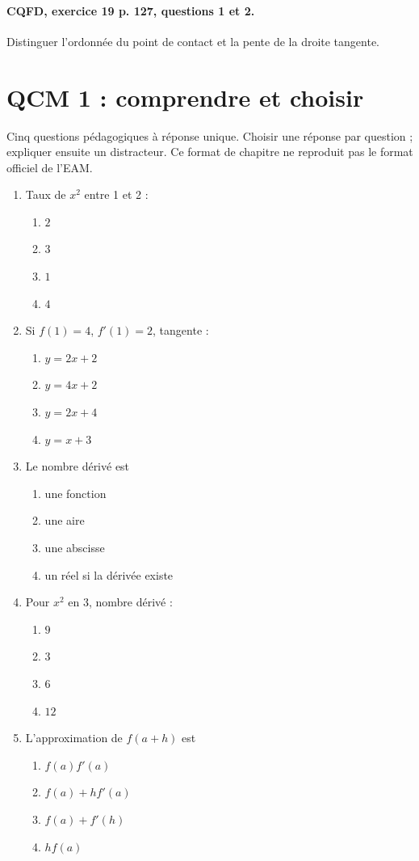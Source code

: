 \paragraph{CQFD, exercice 19 p. 127, questions 1 et 2.}\label{C04-M2} Distinguer l’ordonnée du point de contact et la pente de la droite tangente.
\begingroup\small
\clearpage\section*{QCM 1 : comprendre et choisir}\label{C04-Q1}
Cinq questions pédagogiques à réponse unique. Choisir une réponse par question ; expliquer ensuite un distracteur. Ce format de chapitre ne reproduit pas le format officiel de l’EAM.
\begin{enumerate}
\item Taux de $x^2$ entre 1 et 2 :
\begin{enumerate}[label=\Alph*.,itemsep=2pt]
\item $2$
\item $3$
\item $1$
\item $4$
\end{enumerate}
\item Si $f(1)=4$, $f\prime(1)=2$, tangente :
\begin{enumerate}[label=\Alph*.,itemsep=2pt]
\item $y=2x+2$
\item $y=4x+2$
\item $y=2x+4$
\item $y=x+3$
\end{enumerate}
\item Le nombre dérivé est
\begin{enumerate}[label=\Alph*.,itemsep=2pt]
\item une fonction
\item une aire
\item une abscisse
\item un réel si la dérivée existe
\end{enumerate}
\item Pour $x^2$ en 3, nombre dérivé :
\begin{enumerate}[label=\Alph*.,itemsep=2pt]
\item $9$
\item $3$
\item $6$
\item $12$
\end{enumerate}
\item L’approximation de $f(a+h)$ est
\begin{enumerate}[label=\Alph*.,itemsep=2pt]
\item $f(a)f\prime(a)$
\item $f(a)+hf\prime(a)$
\item $f(a)+f\prime(h)$
\item $hf(a)$
\end{enumerate}
\end{enumerate}
